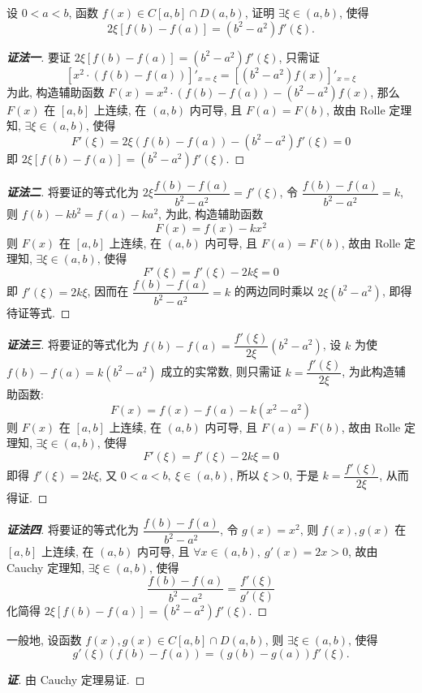 \begin{example}
    设 $0<a<b$, 函数 $f(x)\in C[a,b]\cap D(a,b)$, 证明 $\exists\xi\in(a,b)$, 使得
    $$2\xi[f(b)-f(a)]=(b^2-a^2)f'(\xi).$$
\end{example}
\begin{proof}[{\songti \textbf{证法一}}]
    要证 $2\xi[f(b)-f(a)]=(b^2-a^2)f'(\xi)$, 只需证
    $$\left[x^2\cdot(f(b)-f(a))\right]'_{x=\xi}=\left[(b^2-a^2)f(x)\right]'_{x=\xi}$$
    为此, 构造辅助函数 $F(x)=x^2\cdot(f(b)-f(a))-(b^2-a^2)f(x)$, 那么 $F(x)$ 在 $[a,b]$ 上连续, 在 $(a,b)$ 内可导, 
    且 $F(a)=F(b)$, 故由 Rolle 定理知, $\exists\xi\in(a,b)\text{, 使得 }$
    $$F'(\xi)=2\xi(f(b)-f(a))-(b^2-a^2)f'(\xi)=0$$
    即 $2\xi[f(b)-f(a)]=(b^2-a^2)f'(\xi).$
\end{proof}
\begin{proof}[{\songti \textbf{证法二}}]
    将要证的等式化为 $2\xi\dfrac{f(b)-f(a)}{b^2-a^2}=f'(\xi)$, 令 $\dfrac{f(b)-f(a)}{b^2-a^2}=k$, 则 $f(b)-kb^2=f(a)-ka^2$, 
    为此, 构造辅助函数 $$F(x)=f(x)-kx^2$$
    则 $F(x)$ 在 $[a,b]$ 上连续, 在 $(a,b)$ 内可导, 且 $F(a)=F(b)$, 故由 Rolle 定理知, $\exists\xi\in(a,b)\text{, 使得 }$
    $$F'(\xi)=f'(\xi)-2k\xi =0$$
    即 $f'(\xi)=2k\xi$, 因而在 $\dfrac{f(b)-f(a)}{b^2-a^2}=k$ 的两边同时乘以 $2\xi (b^2-a^2)$, 即得待证等式.
\end{proof}
\begin{proof}[{\songti \textbf{证法三}}]
    将要证的等式化为 $f(b)-f(a)=\dfrac{f'(\xi)}{2\xi}(b^2-a^2)$, 设 $k$ 为使 $f(b)-f(a)=k(b^2-a^2)$ 成立的实常数, 
    则只需证 $k=\dfrac{f'(\xi)}{2\xi}$, 为此构造辅助函数:
    $$F(x)=f(x)-f(a)-k(x^2-a^2)$$
    则 $F(x)$ 在 $[a,b]$ 上连续, 在 $(a,b)$ 内可导, 且 $F(a)=F(b)$, 故由 Rolle 定理知, $\exists\xi\in(a,b)\text{, 使得 }$
    $$F'(\xi)=f'(\xi)-2k\xi=0$$
    即得 $f'(\xi)=2k\xi$, 又 $0<a<b,~\xi\in(a,b)$, 所以 $\xi>0$, 于是 $k=\dfrac{f'(\xi)}{2\xi}$, 从而得证.
\end{proof}
\begin{proof}[{\songti \textbf{证法四}}]
    将要证的等式化为 $\dfrac{f(b)-f(a)}{b^2-a^2}$, 令 $g(x)=x^2$, 则 $f(x),g(x)$ 在 $[a,b]$ 上连续, 在 $(a,b)$ 内可导, 且
    $\forall x\in(a,b),~g'(x)=2x>0$, 故由 Cauchy 定理知, $\exists\xi\in(a,b)\text{, 使得 }$
    $$\dfrac{f(b)-f(a)}{b^2-a^2}=\dfrac{f'(\xi)}{g'(\xi)}$$
    化简得 $2\xi[f(b)-f(a)]=(b^2-a^2)f'(\xi).$
\end{proof}
\begin{inference}
    一般地, 设函数 $f(x),g(x)\in C[a,b]\cap D(a,b)$, 则 $\exists\xi\in(a,b)\text{, 使得 }$
    $$g'(\xi)(f(b)-f(a))=(g(b)-g(a))f'(\xi).$$
\end{inference}
\begin{proof}[{\songti \textbf{证}}]
    由 Cauchy 定理易证.
\end{proof}

